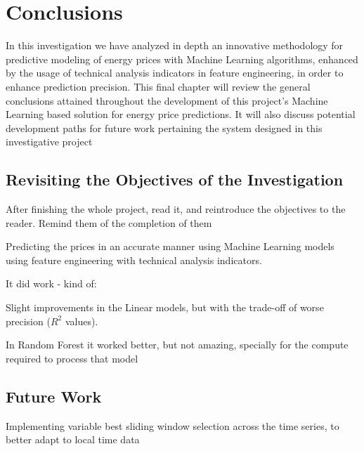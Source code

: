 \documentclass[12pt]{report} %
\begin{document}
\chapter{Conclusions}
In this investigation we have analyzed in depth an innovative methodology for predictive modeling of energy prices with Machine Learning algorithms, enhanced by the usage of technical analysis indicators in feature engineering, in order to enhance prediction precision. This final chapter will review the general conclusions attained throughout the development of this project's Machine Learning based solution for energy price predictions. It will also discuss potential development paths for future work pertaining the system designed in this investigative project



\section{Revisiting the Objectives of the Investigation} %
After finishing the whole project, read it, and reintroduce the objectives to the reader. Remind them of the completion of them

Predicting the prices in an accurate manner using Machine Learning models using feature engineering with technical analysis indicators.

It did work - kind of:

Slight improvements in the Linear models, but with the trade-off of worse precision ($R^2$ values).

In Random Forest it worked better, but not amazing, specially for the compute required to process that model


\section{Future Work}

Implementing variable best sliding window selection across the time series, to better adapt to local time data
\end{document}
